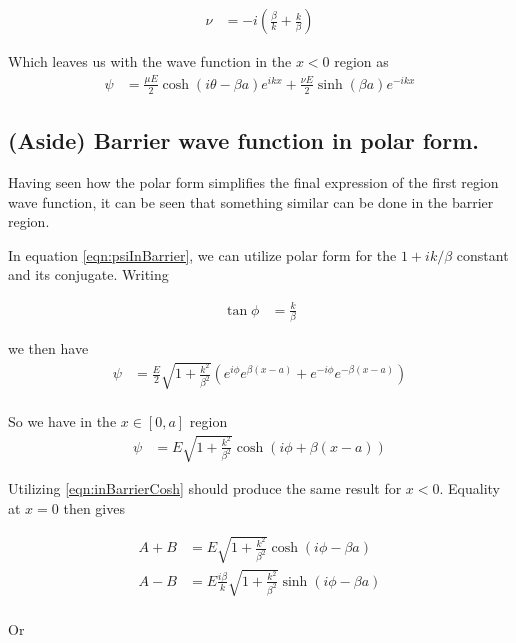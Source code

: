 \documentclass{article}
\begin{document}
\begin{align}\label{eqn:nuDefined}
\nu &= -i \left(\frac{\beta}{k} + \frac{k}{\beta} \right) 
\end{align}

Which leaves us with the wave function in the $x<0$ region as
\begin{align}\label{eqn:incidentAndReflected}
\psi &=
\frac{\mu E}{2}\cosh\left( i\theta -\beta a \right) e^{ i k x }
+\frac{\nu E}{2}\sinh\left( \beta a \right) e^{ -i k x }
\end{align}

\subsection{ (Aside) Barrier wave function in polar form. }

Having seen how the polar form simplifies the final expression of the first region wave function, it can be seen that 
something similar can be done in the barrier region.  

In equation \ref{eqn:psiInBarrier}, we can utilize polar form for the $1+ik/\beta$ constant and its conjugate.  Writing

\begin{align*}
\tan\phi &= \frac{k}{\beta}
\end{align*}

we then have
\begin{align*}
\psi 
&=
\frac{E}{2}\sqrt{1 + \frac{k^2}{\beta^2}} \left( e^{i\phi} e^{ \beta(x-a)} + e^{-i\phi} e^{ -\beta(x-a)} \right) \\
\end{align*}

So we have in the $x \in [0,a]$ region
\begin{align}\label{eqn:inBarrierCosh}
\psi &= E \sqrt{1 + \frac{k^2}{\beta^2}} \cosh\left( i\phi + \beta(x-a) \right) 
\end{align}

Utilizing 
\ref{eqn:inBarrierCosh}
should produce the same result for $x<0$.  Equality at $x=0$ then gives

\begin{align*}
A + B &= E \sqrt{1 + \frac{k^2}{\beta^2}} \cosh\left( i\phi -\beta a \right) \\
A - B &= E \frac{i\beta}{k} \sqrt{1 + \frac{k^2}{\beta^2}} \sinh\left( i\phi -\beta a \right) \\
\end{align*}

Or
\end{document}

